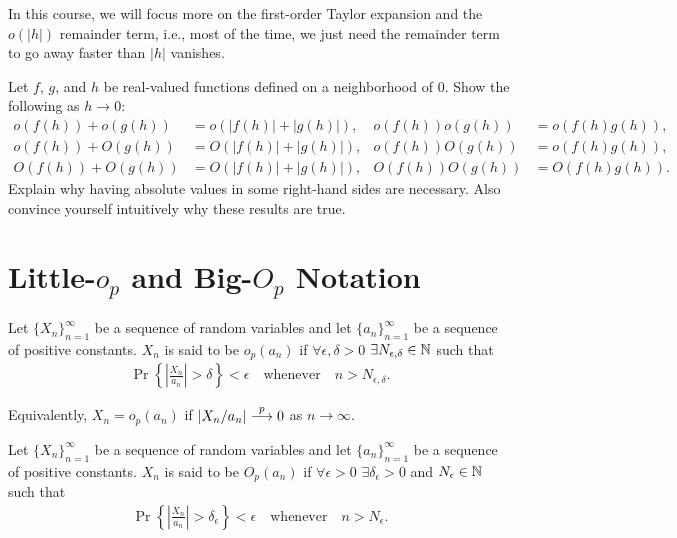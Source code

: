 \documentclass[a4paper,12pt]{article}
\begin{document}
\begin{remark}
	In this course, we will focus more on the first-order Taylor expansion and the $o(|h|)$ remainder term,
	i.e., most of the time,
	we just need the remainder term to go away faster than $|h|$ vanishes.
\end{remark}

\begin{exercise}\label{eg-arithmetic-o}
	Let $f$, $g$, and $h$ be real-valued functions defined on a neighborhood of $0$.
	Show the following as $h \to 0$:
	\begin{align*}
		o(f(h)) + o(g(h)) &= o(|f(h)| + |g(h)|), & o(f(h))o(g(h)) &= o(f(h)g(h)),\\
		o(f(h)) + O(g(h)) &= O(|f(h)| + |g(h)|), & o(f(h))O(g(h)) &= o(f(h)g(h)),\\
		O(f(h)) + O(g(h)) &= O(|f(h)| + |g(h)|), & O(f(h))O(g(h)) &= O(f(h)g(h)).
	\end{align*}
	Explain why having absolute values in some right-hand sides are necessary.
	Also convince yourself intuitively why these results are true.
\end{exercise}

\section{Little-$o_p$ and Big-$O_p$ Notation}

\begin{definition}\label{def-little-op}
	Let $\{X_n\}_{n=1}^{\infty}$ be a sequence of random variables and let $\{a_n\}_{n=1}^{\infty}$ be a sequence of positive constants.
	$X_n$ is said to be $o_p(a_n)$ if $\forall\epsilon,\delta>0$ $\exists N_{\epsilon,\delta}\in\mathbb{N}$ such that
	\begin{align}
		\Pr\left\{\left|\frac{X_n}{a_n}\right| > \delta\right\} < \epsilon
		\quad\text{whenever}\quad
		n > N_{\epsilon,\delta}.
	\end{align}
\end{definition}

\begin{remark}
	Equivalently, $X_n = o_p(a_n)$ if $|X_n/a_n| \overset{p}{\longrightarrow} 0$ as $n \to \infty$.
\end{remark}

\begin{definition}\label{def-big-op}
	Let $\{X_n\}_{n=1}^{\infty}$ be a sequence of random variables and let $\{a_n\}_{n=1}^{\infty}$ be a sequence of positive constants.
	$X_n$ is said to be $O_p(a_n)$ if $\forall\epsilon>0$ $\exists \delta_\epsilon>0$ and $N_\epsilon\in\mathbb{N}$ such that
	\begin{align}
		\Pr\left\{\left|\frac{X_n}{a_n}\right| > \delta_\epsilon\right\} < \epsilon
		\quad\text{whenever}\quad
		n > N_\epsilon.
	\end{align}
\end{definition}
\end{document}
